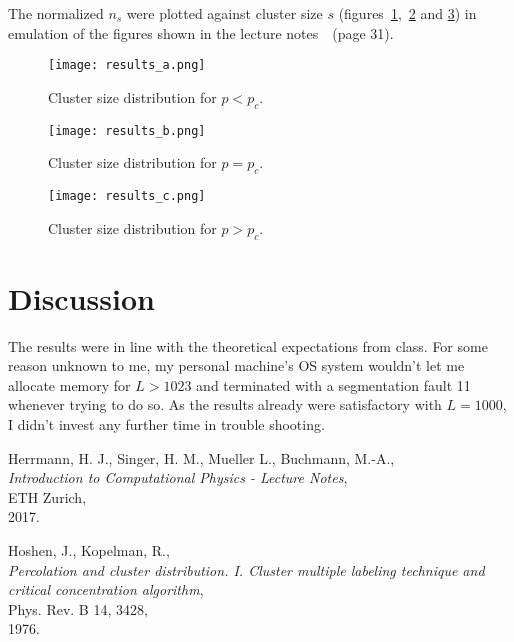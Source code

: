 \documentclass[11pt,a4paper]{article}
\begin{document}
The normalized $n_s$ were plotted against cluster size $s$ (figures~\ref{fig:a},~\ref{fig:b} and \ref{fig:c}) in emulation of the figures shown in the lecture notes~\cite{herrmann}~(page 31).

\begin{figure}[ht]
\begin{center}
\texttt{[image: results\_a.png]} 
\end{center}
\caption{Cluster size distribution for $p < p_c$.}
\label{fig:a}
\end{figure}

\begin{figure}[ht]
\begin{center}
\texttt{[image: results\_b.png]} 
\end{center}
\caption{Cluster size distribution for $p = p_c$.}
\label{fig:b}
\end{figure}

\begin{figure}[ht]
\begin{center}
\texttt{[image: results\_c.png]} 
\end{center}
\caption{Cluster size distribution for $p > p_c$.}
\label{fig:c}
\end{figure}

\section{Discussion}
The results were in line with the theoretical expectations from class.
For some reason unknown to me, my personal machine's OS system wouldn't let me allocate memory for $L > 1023$ and terminated with a segmentation fault 11 whenever trying to do so. As the results already were satisfactory with $L=1000$, I didn't invest any further time in trouble shooting.
\begin{thebibliography}{99}

	Herrmann, H. J.,
	Singer, H. M.,
	Mueller L.,
	Buchmann, M.-A.,\\
	\emph{Introduction to Computational Physics - Lecture Notes},\\
	ETH Zurich,\\
	2017.
	
	Hoshen, J.,
	Kopelman, R.,\\
	\emph{Percolation and cluster distribution. I. Cluster multiple labeling technique and critical concentration algorithm},\\
	Phys. Rev. B 14, 3428,\\
	1976.

\end{thebibliography}
\end{document}
